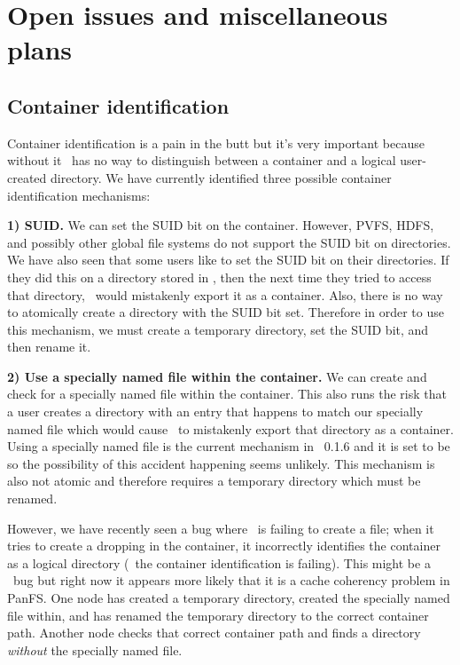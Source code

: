 \documentclass[10pt]{article}
\begin{document}
\section{Open issues and miscellaneous plans}

\subsection{Container identification}

Container identification is a pain in the butt but it's very important because 
without it \plfs\ has no way to distinguish between a container and a logical
user-created directory.  We have currently 
identified three possible container identification mechanisms:  

{\bf 1) SUID.}  We can set the SUID bit on the container.  However, PVFS, HDFS,
and possibly other global file systems do not support the SUID bit on 
directories.  We have also seen that some users like to set the SUID bit on
their directories.  If they did this on a directory stored in \plfs, then the
next time they tried to access that directory, \plfs\ would mistakenly export
it as a container.  Also, there is no way to atomically create a directory 
with the SUID bit set.  Therefore in order to use this mechanism, we must
create a temporary directory, set the SUID bit, and then rename it.

{\bf 2) Use a specially named file within the container.}  We can create and
check for a specially named file within the container.  This also runs the risk
that a user creates a directory with an entry that happens to match our
specially named file which would cause \plfs\ to mistakenly export that
directory as a container.  Using a specially named file is the current
mechanism in \plfs~0.1.6 and it is set to be  so the
possibility of this accident happening seems unlikely.  This mechanism is also
not atomic and therefore requires a temporary directory which must be renamed.

However, we have recently seen a bug where \plfs\ is failing to create a file;
when it tries to create a dropping in the container, it incorrectly identifies
the container as a logical directory (\ie\ the container identification is
failing).  This might be a \plfs\ bug but right now it appears more likely that
it is a cache coherency problem in PanFS.  One node has created a temporary
directory, created the specially named file within, and has renamed the
temporary directory to the correct container path.  Another node checks that
correct container path and finds a directory {\em without} the specially named
file.  
\end{document}

